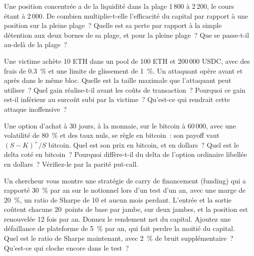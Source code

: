 \begin{question}\label{iq:iv2:crypto-for-traders-and-researchers:25}
Une position concentrée a de la liquidité dans la plage 1\,800 à 2\,200, le cours étant à 2\,000. De combien multiplie-t-elle l'efficacité du capital par rapport à une position sur la pleine plage~? Quelle est sa perte par rapport à la simple détention aux deux bornes de sa plage, et pour la pleine plage~? Que se passe-t-il au-delà de la plage~?
\end{question}

\begin{question}\label{iq:iv2:crypto-for-traders-and-researchers:26}
Une victime achète 10 ETH dans un pool de 100 ETH et 200\,000 USDC, avec des frais de 0.3~\% et une limite de glissement de 1~\%. Un attaquant opère avant et après dans le même bloc. Quelle est la taille maximale que l'attaquant peut utiliser~? Quel gain réalise-t-il avant les coûts de transaction~? Pourquoi ce gain est-il inférieur au surcoût subi par la victime~? Qu'est-ce qui rendrait cette attaque inoffensive~?
\end{question}

\begin{question}\label{iq:iv2:crypto-for-traders-and-researchers:27}
Une option d'achat à 30 jours, à la monnaie, sur le bitcoin à 60\,000, avec une volatilité de 80~\% et des taux nuls, se règle en bitcoin~: son payoff vaut $(S - K)^+/S$ bitcoin. Quel est son prix en bitcoin, et en dollars~? Quel est le delta coté en bitcoin~? Pourquoi diffère-t-il du delta de l'option ordinaire libellée en dollars~? Vérifiez-le par la parité put-call.
\end{question}

\begin{question}\label{iq:iv2:crypto-for-traders-and-researchers:28}
Un chercheur vous montre une stratégie de carry de financement (funding) qui a rapporté 30~\% par an sur le notionnel lors d'un test d'un an, avec une marge de 20~\%, un ratio de Sharpe de 10 et aucun mois perdant. L'entrée et la sortie coûtent chacune 20~points de base par jambe, sur deux jambes, et la position est renouvelée 12 fois par an. Donnez le rendement net du capital. Ajoutez une défaillance de plateforme de 5~\% par an, qui fait perdre la moitié du capital. Quel est le ratio de Sharpe maintenant, avec 2~\% de bruit supplémentaire~? Qu'est-ce qui cloche encore dans le test~?
\end{question}

